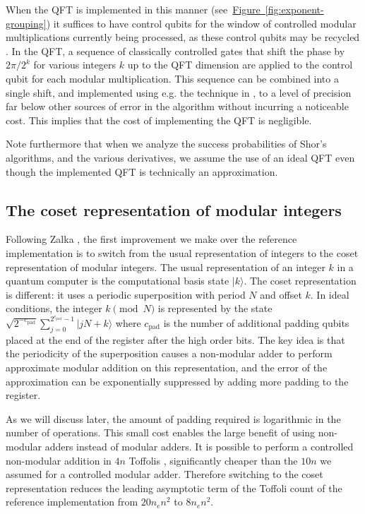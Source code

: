 \documentclass[superscriptaddress,notitlepage,longbibliography]{revtex4-1}
\theoremstyle{definition}
\theoremstyle{definition}
\newcommand{\fig}[1]{\hyperref[fig:#1]{Figure~\ref*{fig:#1}}}
\newcommand{\lenexp}{{n_e}}
\newcommand{\gpad}{{c_{\text{pad}}}}
\begin{document}
When the QFT is implemented in this manner (see~\fig{exponent-grouping}) it suffices to have control qubits for the window of controlled modular multiplications currently being processed, as these control qubits may be recycled \cite{mosca1999recycle, parker2000recycle}. In the QFT, a sequence of classically controlled gates that shift the phase by $2\pi/2^k$ for various integers $k$ up to the QFT dimension are applied to the control qubit for each modular multiplication.
This sequence can be combined into a single shift, and implemented using e.g. the technique in \cite{bocharov2015rus}, to a level of precision far below other sources of error in the algorithm without incurring a noticeable cost. This implies that the cost of implementing the QFT is negligible.

Note furthermore that when we analyze the success probabilities of Shor's algorithms, and the various derivatives, we assume the use of an ideal QFT even though the implemented QFT is technically an approximation.

\subsection{The coset representation of modular integers}

Following Zalka \cite{zalka2006pure}, the first improvement we make over the reference implementation is to switch from the usual representation of integers to the coset representation of modular integers.
The usual representation of an integer $k$ in a quantum computer is the computational basis state $|k\rangle$.
The coset representation is different: it uses a periodic superposition with period $N$ and offset $k$.
In ideal conditions, the integer $k \pmod{N}$ is represented by the state $\sqrt{2^{-\gpad}} \sum_{j=0}^{2^\gpad-1} |jN + k\rangle$ where $\gpad$ is the number of additional padding qubits placed at the end of the register after the high order bits.
The key idea is that the periodicity of the superposition causes a non-modular adder to perform approximate modular addition on this representation, and the error of the approximation can be exponentially suppressed by adding more padding to the register.

As we will discuss later, the amount of padding required is logarithmic in the number of operations.
This small cost enables the large benefit of using non-modular adders instead of modular adders.
It is possible to perform a controlled non-modular addition in $4n$ Toffolis \cite{cuccaro2004adder, gidney2018addition}, significantly cheaper than the $10n$ we assumed for a controlled modular adder.
Therefore switching to the coset representation reduces the leading asymptotic term of the Toffoli count of the reference implementation from $20 \lenexp n^2$ to $8 \lenexp n^2$.
\end{document}
